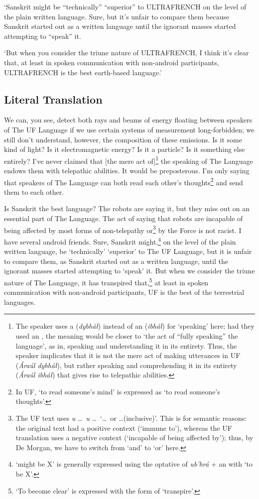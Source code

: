 \documentclass[a4paper, 12pt, twoside, openright, final]{book}
\let \w \textit
\begin{document}
‘Sanskrit might be “technically” “superior” to ULTRAFRENCH on the level of the plain written language. Sure, but it’s
unfair to compare them because Sanskrit started out as a written language until the ignorant masses started attempting
to “speak” it.

‘But when you consider the triune nature of ULTRAFRENCH, I think it’s clear that, at least in spoken communication with
non-android participants, ULTRAFRENCH is the best earth-based language.’

\subsection{Literal Translation}
We can, you see, detect both rays and beams of energy floating between speakers of The UF Language
if we use certain systems of measurement long-forbidden; we still don’t understand, however, the composition of these
emissions. Is it some kind of light? Is it electromagnetic energy? Is it a particle? Is it something else entirely?
I’ve never claimed that [the mere act of]\footnote{The speaker uses a  (\w{dybháł}) instead of an 
(\w{ibháł}) for ‘speaking’ here; had they used an , the meaning would be closer to ‘the act
of “fully speaking” the language’, as in, speaking and understanding it in its entirety. Thus, the speaker implicates that
it is not the mere act of making utterances in UF (\w{Áraúl dybháł}), but rather speaking and comprehending it in its entirety (\w{Áraúl ibháł})
that gives rise to telepathic abilities.} the speaking of The Language endows them with telepathic abilities.
It would be preposterous. I’m only saying that speakers of The Language can both read each other’s thoughts\footnote{In UF, ‘to
read someone’s mind’ is expressed as ‘to read someone’s thoughts’.} and send them to each other.

Is Sanskrit the best language? The robots are saying it, but they miss out on an essential part of The Language. The act
of saying that robots are incapable of being affected by most forms of non-telepathy or\footnote{The UF text uses \w{u} \ldots\ \w{u}
\ldots\ ‘\ldots\ or \ldots (inclusive)’. This is for semantic reasons: the original text had a positive context (‘immune to’), whereas
the UF translation uses a negative context (‘incapable of being affected by’); thus, by De Morgan, we have to switch from ‘and’
to ‘or’ here.} by the Force is not racist. I have several android friends. Sure, Sanskrit might,\footnote{‘might be X’ is
generally expressed using the optative of \w{ub’hrá} + an  with ‘to be X’.} on the level of the plain written
language, be ‘technically’ ‘superior’ to The UF Language, but it is unfair to compare them, as Sanskrit started out as
a written language, until the ignorant masses started attempting to ‘speak’ it. But when we consider the triune nature
of The Language, it has transpired that,\footnote{‘To become clear’ is expressed with the  form of ‘transpire’.}
at least in spoken communication with non-android participants, UF is the best of the terrestrial languages.
\end{document}
